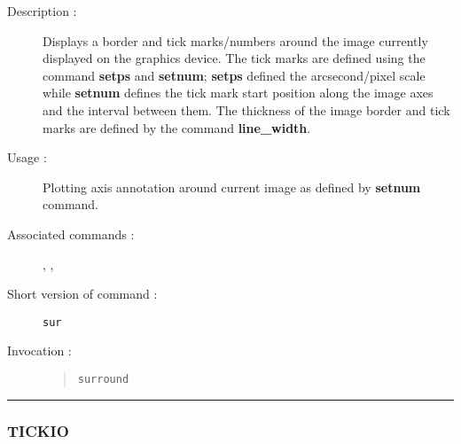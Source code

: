 \begin{description}

\item[Description :] Displays a border and tick marks/numbers around
the image currently displayed on the graphics device.  The tick marks
are defined using the command {\bf setps} and {\bf setnum}; {\bf setps}
defined the arcsecond/pixel scale while {\bf setnum} defines the tick
mark start position along the image axes and the interval between
them.  The thickness of the image border and tick marks are defined by
the command {\bf line\_width}.

\item[Usage :] Plotting axis annotation around current image as defined by
{\bf setnum} command.

\item[Associated commands :] {\tt {}},
{\tt {}}, {\tt {}}

\item[Short version of command :] {\tt sur}
\item[Invocation :]

\begin{quote}{\tt  surround }\end{quote}

\end{description}

\hrule
\subsubsection*{\label{TICKIO}TICKIO}

